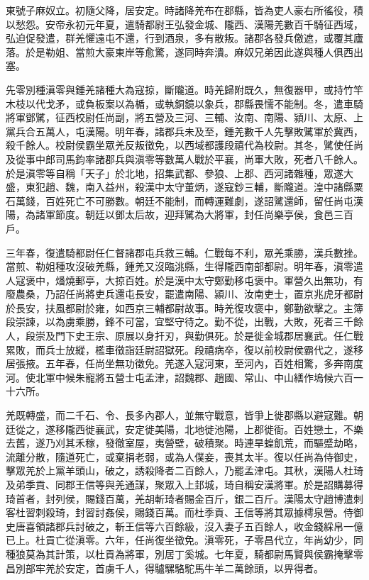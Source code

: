 \begin{pinyinscope}
東號子麻奴立。初隨父降，居安定。時諸降羌布在郡縣，皆為吏人豪右所徭役，積以愁怨。安帝永初元年夏，遣騎都尉王弘發金城、隴西、漢陽羌數百千騎征西域，弘迫促發遣，群羌懼遠屯不還，行到酒泉，多有散叛。諸郡各發兵儌遮，或覆其廬落。於是勒姐、當煎大豪東岸等愈驚，遂同時奔潰。麻奴兄弟因此遂與種人俱西出塞。

先零別種滇零與鍾羌諸種大為寇掠，斷隴道。時羌歸附既久，無復器甲，或持竹竿木枝以代戈矛，或負板案以為楯，或執銅鏡以象兵，郡縣畏懦不能制。冬，遣車騎將軍鄧騭，征西校尉任尚副，將五營及三河、三輔、汝南、南陽、潁川、太原、上黨兵合五萬人，屯漢陽。明年春，諸郡兵未及至，鍾羌數千人先擊敗騭軍於冀西，殺千餘人。校尉侯霸坐眾羌反叛徵免，以西域都護段禧代為校尉。其冬，騭使任尚及從事中郎司馬鈞率諸郡兵與滇零等數萬人戰於平襄，尚軍大敗，死者八千餘人。於是滇零等自稱「天子」於北地，招集武都、參狼、上郡、西河諸雜種，眾遂大盛，東犯趙、魏，南入益州，殺漢中太守董炳，遂寇鈔三輔，斷隴道。湟中諸縣粟石萬錢，百姓死亡不可勝數。朝廷不能制，而轉運難劇，遂詔騭還師，留任尚屯漢陽，為諸軍節度。朝廷以鄧太后故，迎拜騭為大將軍，封任尚樂亭侯，食邑三百戶。

三年春，復遣騎都尉任仁督諸郡屯兵救三輔。仁戰每不利，眾羌乘勝，漢兵數挫。當煎、勒姐種攻沒破羌縣，鍾羌又沒臨洮縣，生得隴西南部都尉。明年春，滇零遣人寇褒中，燔燒郵亭，大掠百姓。於是漢中太守鄭勤移屯褒中。軍營久出無功，有廢農桑，乃詔任尚將吏兵還屯長安，罷遣南陽、潁川、汝南吏士，置京兆虎牙都尉於長安，扶風都尉於雍，如西京三輔都尉故事。時羌復攻褒中，鄭勤欲擊之。主簿段崇諫，以為虜乘勝，鋒不可當，宜堅守待之。勤不從，出戰，大敗，死者三千餘人，段崇及門下史王宗、原展以身扞刃，與勤俱死。於是徙金城郡居襄武。任仁戰累敗，而兵士放縱，檻車徵詣廷尉詔獄死。段禧病卒，復以前校尉侯霸代之，遂移居張掖。五年春，任尚坐無功徵免。羌遂入寇河東，至河內，百姓相驚，多奔南度河。使北軍中候朱寵將五營士屯孟津，詔魏郡、趙國、常山、中山繕作塢候六百一十六所。

羌既轉盛，而二千石、令、長多內郡人，並無守戰意，皆爭上徙郡縣以避寇難。朝廷從之，遂移隴西徙襄武，安定徙美陽，北地徙池陽，上郡徙衙。百姓戀土，不樂去舊，遂乃刈其禾稼，發徹室屋，夷營壁，破積聚。時連旱蝗飢荒，而驅蹙劫略，流離分散，隨道死亡，或棄捐老弱，或為人僕妾，喪其太半。復以任尚為侍御史，擊眾羌於上黨羊頭山，破之，誘殺降者二百餘人，乃罷孟津屯。其秋，漢陽人杜琦及弟季貢、同郡王信等與羌通謀，聚眾入上邽城，琦自稱安漢將軍。於是詔購募得琦首者，封列侯，賜錢百萬，羌胡斬琦者賜金百斤，銀二百斤。漢陽太守趙博遣刺客杜習刺殺琦，封習討姦侯，賜錢百萬。而杜季貢、王信等將其眾據樗泉營。侍御史唐喜領諸郡兵討破之，斬王信等六百餘級，沒入妻子五百餘人，收金錢綵帛一億已上。杜貢亡從滇零。六年，任尚復坐徵免。滇零死，子零昌代立，年尚幼少，同種狼莫為其計策，以杜貢為將軍，別居丁奚城。七年夏，騎都尉馬賢與侯霸掩擊零昌別部牢羌於安定，首虜千人，得驢騾駱駝馬牛羊二萬餘頭，以畀得者。


\end{pinyinscope}
